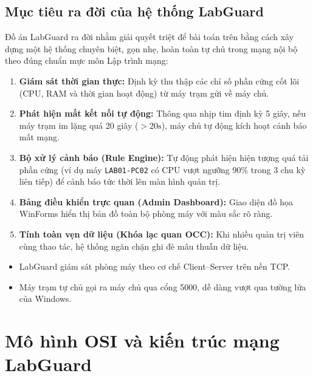 \documentclass[12pt,a4paper]{article}
\begin{document}
\subsection{Mục tiêu ra đời của hệ thống LabGuard}
Đồ án LabGuard ra đời nhằm giải quyết triệt để bài toán trên bằng cách xây dựng một hệ thống chuyên biệt, gọn nhẹ, hoàn toàn tự chủ trong mạng nội bộ theo đúng chuẩn mực môn Lập trình mạng:
\begin{enumerate}
  \item \textbf{Giám sát thời gian thực:} Định kỳ thu thập các chỉ số phần cứng cốt lõi (CPU, RAM và thời gian hoạt động) từ máy trạm gửi về máy chủ.
  \item \textbf{Phát hiện mất kết nối tự động:} Thông qua nhịp tim định kỳ 5 giây, nếu máy trạm im lặng quá 20 giây ($> 20\text{s}$), máy chủ tự động kích hoạt cảnh báo mất mạng.
  \item \textbf{Bộ xử lý cảnh báo (Rule Engine):} Tự động phát hiện hiện tượng quá tải phần cứng (ví dụ máy \texttt{LAB01-PC02} có CPU vượt ngưỡng $90\%$ trong 3 chu kỳ liên tiếp) để cảnh báo tức thời lên màn hình quản trị.
  \item \textbf{Bảng điều khiển trực quan (Admin Dashboard):} Giao diện đồ họa WinForms hiển thị bản đồ toàn bộ phòng máy với màu sắc rõ ràng.
  \item \textbf{Tính toàn vẹn dữ liệu (Khóa lạc quan OCC):} Khi nhiều quản trị viên cùng thao tác, hệ thống ngăn chặn ghi đè mâu thuẫn dữ liệu.
\end{enumerate}

\begin{takeawaybox}
\begin{itemize}[leftmargin=1.5em, itemsep=1pt]
  \item LabGuard giám sát phòng máy theo cơ chế Client--Server trên nền TCP.
  \item Máy trạm tự chủ gọi ra máy chủ qua cổng 5000, dễ dàng vượt qua tường lửa của Windows.
\end{itemize}
\end{takeawaybox}

\section{Mô hình OSI và kiến trúc mạng LabGuard}
\end{document}
